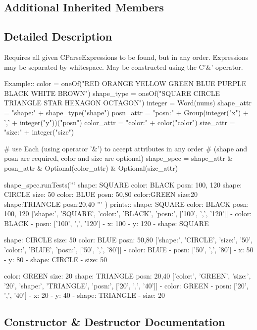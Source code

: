 \subsection*{Additional Inherited Members}


\subsection{Detailed Description}
\begin{DoxyVerb}Requires all given C{ParseExpression}s to be found, but in any order.
Expressions may be separated by whitespace.
May be constructed using the C{'&'} operator.

Example::
    color = oneOf("RED ORANGE YELLOW GREEN BLUE PURPLE BLACK WHITE BROWN")
    shape_type = oneOf("SQUARE CIRCLE TRIANGLE STAR HEXAGON OCTAGON")
    integer = Word(nums)
    shape_attr = "shape:" + shape_type("shape")
    posn_attr = "posn:" + Group(integer("x") + ',' + integer("y"))("posn")
    color_attr = "color:" + color("color")
    size_attr = "size:" + integer("size")

    # use Each (using operator '&') to accept attributes in any order 
    # (shape and posn are required, color and size are optional)
    shape_spec = shape_attr & posn_attr & Optional(color_attr) & Optional(size_attr)

    shape_spec.runTests('''
        shape: SQUARE color: BLACK posn: 100, 120
        shape: CIRCLE size: 50 color: BLUE posn: 50,80
        color:GREEN size:20 shape:TRIANGLE posn:20,40
        '''
        )
prints::
    shape: SQUARE color: BLACK posn: 100, 120
    ['shape:', 'SQUARE', 'color:', 'BLACK', 'posn:', ['100', ',', '120']]
    - color: BLACK
    - posn: ['100', ',', '120']
      - x: 100
      - y: 120
    - shape: SQUARE


    shape: CIRCLE size: 50 color: BLUE posn: 50,80
    ['shape:', 'CIRCLE', 'size:', '50', 'color:', 'BLUE', 'posn:', ['50', ',', '80']]
    - color: BLUE
    - posn: ['50', ',', '80']
      - x: 50
      - y: 80
    - shape: CIRCLE
    - size: 50


    color: GREEN size: 20 shape: TRIANGLE posn: 20,40
    ['color:', 'GREEN', 'size:', '20', 'shape:', 'TRIANGLE', 'posn:', ['20', ',', '40']]
    - color: GREEN
    - posn: ['20', ',', '40']
      - x: 20
      - y: 40
    - shape: TRIANGLE
    - size: 20
\end{DoxyVerb}
 

\subsection{Constructor \& Destructor Documentation}
\mbox{\label{classsetuptools_1_1__vendor_1_1pyparsing_1_1Each_af875a9988c483efdc95ddf58f94b9052}} 

